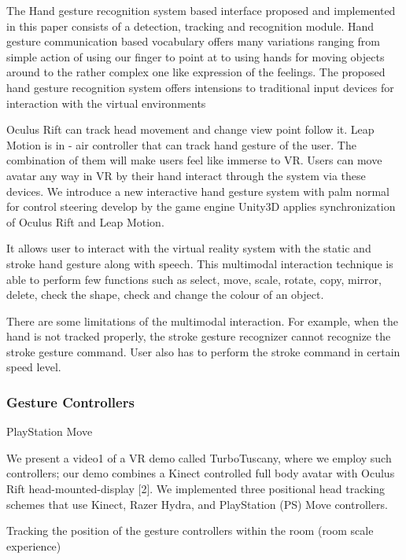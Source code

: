 The Hand gesture recognition system based interface proposed and implemented in this paper consists of a detection, tracking and recognition module.
Hand gesture communication based vocabulary offers many variations ranging from simple action of using our finger to point at to using hands for moving objects around to the rather complex one like expression of the feelings. The proposed hand gesture recognition system offers intensions to traditional input devices for interaction with the virtual environments
\cite{Rautaray2011}

Oculus Rift can track head movement and change view point follow it. Leap Motion is in - air controller that can track hand gesture of the user. The combination of them will make users feel like immerse to VR. Users can move avatar any way in VR by their hand interact through the system via these devices. We introduce a new interactive hand gesture system with palm normal for control steering develop by the game engine Unity3D applies synchronization of Oculus Rift and Leap Motion.
\cite{Khundam2015a}

It allows user to interact with the virtual reality system with the static and stroke hand gesture along with speech. This multimodal interaction technique is able to perform few functions such as select, move, scale, rotate, copy, mirror, delete, check the shape, check and change the colour of an object.
\cite{Chun2015}

There are some limitations of the multimodal interaction. For example, when the hand is not tracked properly, the stroke gesture recognizer cannot recognize the stroke gesture command. User also has to perform the stroke command in certain speed level.
\cite{Chun2015}

\subsubsection{Gesture Controllers}

PlayStation Move
\cite{Sony2010}

We present a video1 of a VR demo called TurboTuscany, where we employ such controllers; our demo combines a Kinect controlled full body avatar with Oculus Rift head-mounted-display [2]. We implemented three positional head tracking schemes that use Kinect, Razer Hydra, and PlayStation (PS) Move controllers.
\cite{Takala2014}

Tracking the position of the gesture controllers within the room (room scale experience)
\cite{Htcvive2016}


